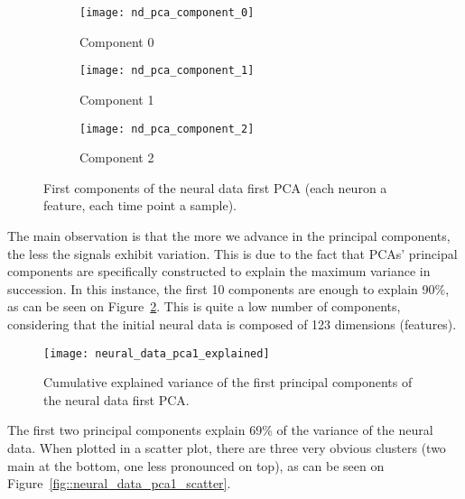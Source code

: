 \begin{figure}[htbp]
	\begin{center}
		\begin{subfigure}{\textwidth}
			\begin{center}
				\texttt{[image: nd\_pca\_component\_0]}
				\caption{Component 0}
			\end{center}
		\end{subfigure}
		\newline
		\begin{subfigure}{\textwidth}
			\begin{center}
				\texttt{[image: nd\_pca\_component\_1]}
				\caption{Component 1}
			\end{center}
		\end{subfigure}
		\newline
		\begin{subfigure}{\textwidth}
			\begin{center}
				\texttt{[image: nd\_pca\_component\_2]}
				\caption{Component 2}
			\end{center}
		\end{subfigure}
		\caption{First components of the neural data first PCA (each neuron a feature, each time point a sample).}
		\label{fig::neural_data_pca1}
	\end{center}
\end{figure}

The main observation is that the more we advance in the principal components, the less the signals exhibit variation.
This is due to the fact that PCAs' principal components are specifically constructed to explain the maximum variance in succession.
In this instance, the first 10 components are enough to explain 90\%, as can be seen on Figure~\ref{fig::neural_data_pca1_explained}.
This is quite a low number of components, considering that the initial neural data is composed of 123 dimensions (features).

\begin{figure}[htbp]
	\begin{center}
		\texttt{[image: neural\_data\_pca1\_explained]}
		\caption{Cumulative explained variance of the first principal components of the neural data first PCA.}
		\label{fig::neural_data_pca1_explained}
	\end{center}
\end{figure}

The first two principal components explain 69\% of the variance of the neural data.
When plotted in a scatter plot, there are three very obvious clusters (two main at the bottom, one less pronounced on top), as can be seen on Figure~\ref{fig::neural_data_pca1_scatter}.

